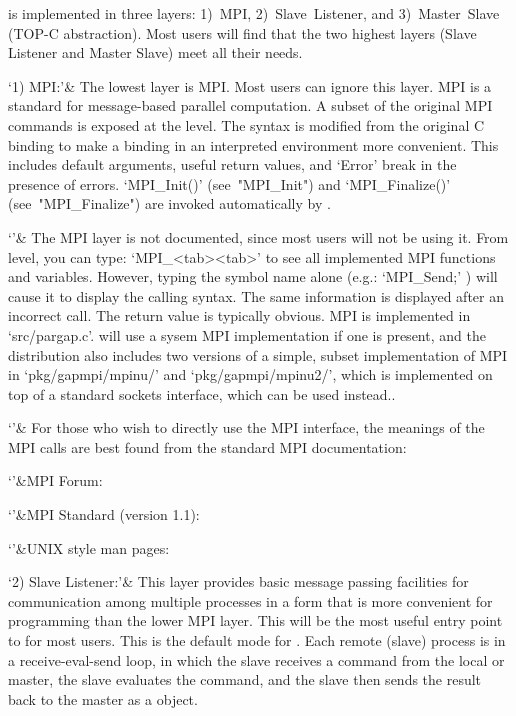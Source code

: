 {\ParGAP} is implemented in three layers: 1)~MPI, 2)~Slave~Listener,  and
3)~Master~Slave (TOP-C abstraction). Most users will find  that  the  two
highest layers (Slave Listener and Master Slave) meet all their needs.

\beginitems
`1) MPI:'&
    The lowest layer is MPI. Most users can ignore this layer. MPI  is  a
    standard for message-based parallel  computation.  A  subset  of  the
    original MPI commands is exposed at the {\GAP} level. The syntax is
    modified from the original C binding to  make  a  {\GAP}  binding in
    an interpreted environment more convenient. This includes default
    arguments, useful return values, and `Error' break in the presence of
    errors. `MPI_Init()' (see~"MPI_Init") and `MPI_Finalize()'
    (see~"MPI_Finalize") are invoked automatically by {\ParGAP}.

`'& The MPI layer is not documented, since most users will not  be  using
    it. From {\GAP} level, you can  type:  `MPI_<tab><tab>'  to  see  all
    implemented MPI functions and variables. However, typing  the  symbol
    name alone (e.g.: `MPI_Send;' ) will cause it to display the  calling
    syntax. The same information is displayed after  an  incorrect  call.
    The  return  value  is  typically  obvious.  MPI  is  implemented  in
    `src/pargap.c'. {\ParGAP} will use a sysem MPI implementation if one is
    present, and the distribution also includes two versions of a simple, subset
    implementation of MPI in `pkg/gapmpi/mpinu/' and `pkg/gapmpi/mpinu2/', 
    which is implemented on top of a standard sockets interface, which can be 
    used instead..

`'& For those who wish to directly use the MPI interface, the meanings of
    the MPI calls are best found from the standard MPI documentation:

`'&MPI Forum: 

`'&MPI Standard (version 1.1):

`'&UNIX style man pages: 

`2) Slave Listener:'&
    This  layer   provides   basic   message   passing   facilities   for
    communication among multiple {\ParGAP} processes in a  form  that  is
    more convenient for programming than the lower MPI layer.  This  will
    be the most useful entry point to {\ParGAP} for most users.  This  is
    the default mode for {\ParGAP}. Each remote (slave) process is  in  a
    receive-eval-send loop, in which the slave receives a {\GAP}  command
    from the local or master, the slave evaluates the {\GAP} command, and
    the slave then sends the result  back  to  the  master  as  a  {\GAP}
    object.

